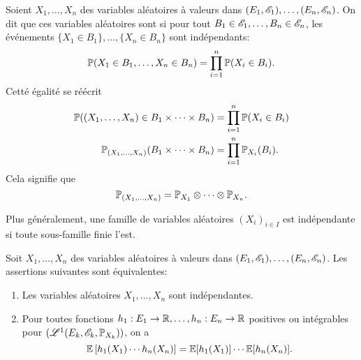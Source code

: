 \begin{definition}
    Soient \(X_1,\ldots,X_n\) des variables aléatoires à valeurs dans
    \((E_1,\mathscr{E}_1),\ldots,(E_n,\mathscr{E}_n)\). On dit que ces variables
    aléatoires sont  si pour tout \(B_1\in\mathscr{E}_1,\ldots,B_n\in\mathscr{E}_n\),
    les événements \(\{X_1\in B_1\},\ldots,\{X_n\in B_n\}\) sont indépendants:
    \begin{equation*}
        \mathbb{P}(X_1\in B_1,\ldots,X_n\in B_n) = \prod_{i=1}^n \mathbb{P}(X_i\in B_i).
    \end{equation*}
    Cetté égalité se réécrit
    \begin{equation*}
        \begin{aligned}
            \mathbb{P}((X_1,\ldots,X_n)\in B_1\times\cdots\times B_n) 
            &= \prod_{i=1}^n \mathbb{P}(X_i\in B_i)\\
            \mathbb{P}_{(X_1,\ldots,X_n)}(B_1\times\cdots\times B_n)
            &= \prod_{i=1}^n \mathbb{P}_{X_i}(B_i).
        \end{aligned}
    \end{equation*}
    Cela signifie que 
    \begin{equation*}
        \mathbb{P}_{(X_1,\ldots,X_n)} = \mathbb{P}_{X_1}\otimes\cdots\otimes\mathbb{P}_{X_n}.
    \end{equation*}

    Plus généralement, une famille de variables aléatoires \({(X_i)}_{i\in I}\) est indépendante
    si toute sous-famille finie l'est.
\end{definition}

\begin{proposition}
    Soit \(X_1,\ldots,X_n\) des variables aléatoires à valeurs dans
    \((E_1,\mathscr{E}_1),\ldots,(E_n,\mathscr{E}_n)\). Les assertions
    suivantes sont équivalentes:
    \begin{enumerate}
        \item Les variables aléatoires \(X_1,\ldots,X_n\) sont indépendantes.
        \item Pour toutes fonctions \(h_1:E_1\to\mathbb{R},\ldots,h_n:E_n\to\mathbb{R}\)
        positives ou intégrables pour \((\mathscr{L}^1(E_k,\mathscr{E}_k, \mathbb{P}_{X_k}))\),
        on a
        \begin{equation*}
            \mathbb{E}\left[ h_1(X_1)\cdots h_n(X_n) \right] = \mathbb{E}[h_1(X_1)]\cdots \mathbb{E}[h_n(X_n)].
        \end{equation*}
    \end{enumerate}
\end{proposition}

